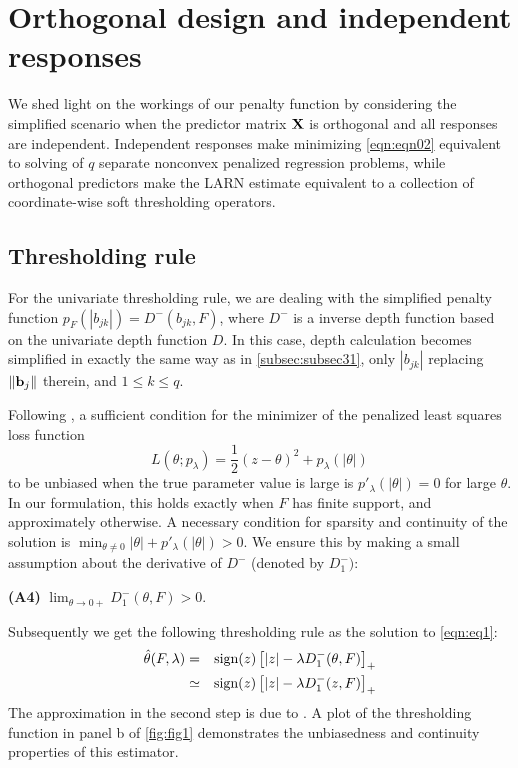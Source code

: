 \section{Orthogonal design and independent responses}
\label{sec:regression-sec4}

We shed light on the workings of our penalty function by considering the simplified scenario when the predictor matrix ${\mathbf{X}}$ is orthogonal and all responses are independent. Independent responses make minimizing \ref{eqn:eqn02} equivalent to solving of $q$ separate nonconvex penalized regression problems, while orthogonal predictors make the LARN estimate equivalent to a collection of coordinate-wise soft thresholding operators.

\subsection{Thresholding rule}

For the univariate thresholding rule, we are dealing with the simplified penalty function $p_F (|b_{jk}|) = D^- (b_{jk}, F)$, where $D^-$ is a inverse depth function based on the univariate depth function $D$. In this case, depth calculation becomes simplified in exactly the same way as in \ref{subsec:subsec31}, only $|b_{jk}|$ replacing $\|{\bf{b}}_j\|$ therein, and $1 \leq k \leq q$.

Following \cite{FanLi01}, a sufficient condition for the minimizer of the penalized least squares loss function
%
\begin{equation}\label{eqn:eq1}
L(\theta; p_\lambda) = \frac{1}{2} (z - \theta)^2 + p_\lambda(|\theta|)
\end{equation}
%
to be unbiased when the true parameter value is large is $p'_\lambda (|\theta|)=0$ for large $\theta$. In our formulation, this holds exactly when $F$ has finite support, and approximately otherwise. A necessary condition for sparsity and continuity of the solution is $\min_{\theta \neq 0} |\theta| + p'_\lambda(|\theta|)>0$. We ensure this by making a small assumption about the derivative of $D^-$ (denoted by $D^-_1)$:

\vspace{1em}
\noindent\textbf{(A4)} $\lim_{\theta \rightarrow 0+} D^-_1(\theta,F)> 0$.
\vspace{1em}

Subsequently we get the following thresholding rule as the solution to \ref{eqn:eq1}:
%
\begin{eqnarray}\label{eqn:soln_1d}
\hat\theta(F, \lambda) &=& \text{sign} (z) \left[ |z| - \lambda D^-_1(\theta,F) \right]_+ \notag\\
& \simeq & \text{sign} (z) \left[ |z| - \lambda D^-_1(z,F) \right]_+
\end{eqnarray}
%
The approximation in the second step is due to \cite{AntoniadisFan01}. A plot of the thresholding function in panel b of \ref{fig:fig1} demonstrates the unbiasedness and continuity  properties of this estimator.

